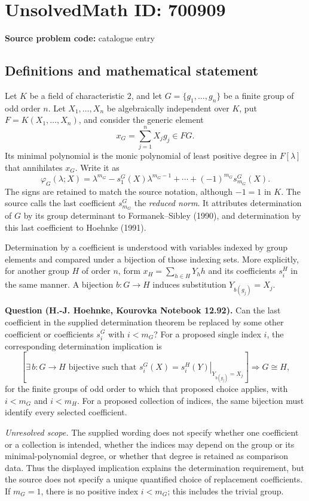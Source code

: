 \documentclass[11pt]{article}
\begin{document}
\section*{UnsolvedMath ID: 700909}
\textbf{Source problem code:} catalogue entry
\subsection{Definitions and mathematical statement}
Let \(K\) be a field of characteristic \(2\), and let \(G=\{g_1,\ldots,g_n\}\) be a finite group of odd order \(n\). Let \(X_1,\ldots,X_n\) be algebraically independent over \(K\), put \(F=K(X_1,\ldots,X_n)\), and consider the generic element
\[
x_G=\sum_{j=1}^{n}X_jg_j\in FG.
\]
Its minimal polynomial is the monic polynomial of least positive degree in \(F[\lambda]\) that annihilates \(x_G\). Write it as
\[
\varphi_G(\lambda;X)=\lambda^{m_G}-s_1^G(X)\lambda^{m_G-1}+\cdots+(-1)^{m_G}s_{m_G}^G(X).
\]
The signs are retained to match the source notation, although \(-1=1\) in \(K\). The source calls the last coefficient \(s_{m_G}^G\) the \emph{reduced norm}. It attributes determination of \(G\) by its group determinant to Formanek--Sibley (1990), and determination by this last coefficient to Hoehnke (1991).

Determination by a coefficient is understood with variables indexed by group elements and compared under a bijection of those indexing sets. More explicitly, for another group \(H\) of order \(n\), form \(x_H=\sum_{h\in H}Y_hh\) and its coefficients \(s_i^H\) in the same manner. A bijection \(b:G\to H\) induces substitution \(Y_{b(g_j)}=X_j\).

\textbf{Question (H.-J. Hoehnke, Kourovka Notebook 12.92).} Can the last coefficient in the supplied determination theorem be replaced by some other coefficient or coefficients \(s_i^G\) with \(i<m_G\)? For a proposed single index \(i\), the corresponding determination implication is
\[
\left[\exists\,b:G\to H\text{ bijective such that }
 s_i^G(X)=\left.s_i^H(Y)\right|_{Y_{b(g_j)}=X_j}\right]
\Longrightarrow G\cong H,
\]
for the finite groups of odd order to which that proposed choice applies, with \(i<m_G\) and \(i<m_H\). For a proposed collection of indices, the same bijection must identify every selected coefficient.

\emph{Unresolved scope.} The supplied wording does not specify whether one coefficient or a collection is intended, whether the indices may depend on the group or its minimal-polynomial degree, or whether that degree is retained as comparison data. Thus the displayed implication explains the determination requirement, but the source does not specify a unique quantified choice of replacement coefficients. If \(m_G=1\), there is no positive index \(i<m_G\); this includes the trivial group.
\end{document}
